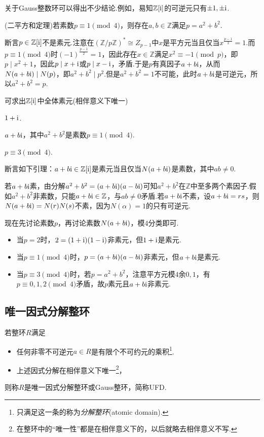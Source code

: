 \begin{remark}
    关于Gauss整数环可以得出不少结论.例如，易知$\mathbb{Z}[\mathrm{i}]$的可逆元只有$\pm 1,\pm\mathrm{i}$.
\end{remark}
\begin{remark}
    (二平方和定理)若素数$p\equiv 1\pmod4$，则存在$a,b\in\mathbb{Z}$满足$p=a^2+b^2$.

    断言$p\in\mathbb{Z}[\mathrm{i}]$不是素元.注意在$(\mathbb{Z}/p\mathbb{Z})^*\cong Z_{p-1}$中$x$是平方元当且仅当$x^{\frac{p-1}{2}}=1$.而$p\equiv 1\pmod4$时$(-1)^{\frac{p-1}{2}}=1$，因此存在$x\in\mathbb{Z}$满足$x^2\equiv-1\pmod p$，即$p\mid x^2+1$，因此$p\mid x+\mathrm{i}$或$p\mid x-\mathrm{i}$，矛盾.于是$p$有真因子$a+b\mathrm{i}$，从而$N(a+b\mathrm{i})\mid N(p)$，即$a^2+b^2\mid p^2$.但是$a^2+b^2=1$不可能，此时$a+b\mathrm{i}$是可逆元，所以$a^2+b^2=p$.
\end{remark}
\begin{remark}
    可求出$\mathbb{Z}[\mathrm{i}]$中全体素元(相伴意义下唯一)

    \begin{itemize*}
        \item $1+\mathrm{i}$.
        \item $a+b\mathrm{i}$，其中$a^2+b^2$是素数$p\equiv 1\pmod 4$.
        \item $p\equiv 3\pmod 4$.
    \end{itemize*}

    断言如下引理：$a+b\mathrm{i}\in\mathbb{Z}[\mathrm{i}]$是素元当且仅当$N(a+b\mathrm{i})$是素数，其中$ab\ne 0$.

    若$a+b\mathrm{i}$素，由分解$a^2+b^2=(a+b\mathrm{i})(a-b\mathrm{i})$可知$a^2+b^2$在$\mathbb{Z}$中至多两个素因子.假如$a^2+b^2$非素数，只能$a+b\mathrm{i}\in\mathbb{Z}$，与$ab\ne 0$矛盾.若$a+b\mathrm{i}$不素，设$a+b\mathrm{i}=rs$，则$N(a+b\mathrm{i})=N(r)N(s)$不素，因为$N(\alpha)=1$的只有可逆元.

    现在先讨论素数$p$，再讨论素数$N(a+b\mathrm{i})$，模$4$分类即可.
    \begin{itemize}
        \item 当$p=2$时，$2=(1+\mathrm{i})(1-\mathrm{i})$非素元，但$1+\mathrm{i}$是素元.
        \item 当$p\equiv 1\pmod 4$时，$p=(a+b\mathrm{i})(a-b\mathrm{i})$非素元，但$a+b\mathrm{i}$是素元.
        \item 当$p\equiv 3\pmod 4$时，若$p=a^2+b^2$，注意平方元模$4$余$0,1$，有$p\equiv 0,1,2\pmod 4$矛盾，故$p$素元且$a+b\mathrm{i}$非素元.
    \end{itemize}
\end{remark}

\subsection{唯一因式分解整环}
\begin{definition}
    若整环$R$满足
    \begin{itemize}
        \item 任何非零不可逆元$a\in R$是有限个不可约元的乘积\footnote{只满足这一条的称为\emph{分解整环}(atomic domain).}.
        \item 上述因式分解在相伴意义下唯一\footnote{在整环中的“唯一性”都是在相伴意义下的，以后就略去相伴意义不写.}，
    \end{itemize}
    则称$R$是{\heiti 唯一因式分解整环}或{\heiti Gauss整环}，简称UFD.
\end{definition}

